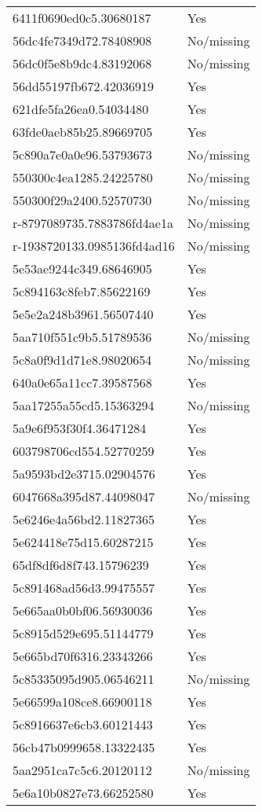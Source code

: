 \begin{tabular}{ll}
6411f0690ed0c5.30680187 & Yes \\
56dc4fe7349d72.78408908 & No/missing \\
56dc0f5e8b9dc4.83192068 & No/missing \\
56dd55197fb672.42036919 & Yes \\
621dfe5fa26ea0.54034480 & Yes \\
63fde0aeb85b25.89669705 & Yes \\
5c890a7e0a0e96.53793673 & No/missing \\
550300c4ea1285.24225780 & No/missing \\
550300f29a2400.52570730 & No/missing \\
r-8797089735.7883786fd4ae1a & No/missing \\
r-1938720133.0985136fd4ad16 & No/missing \\
5e53ae9244c349.68646905 & Yes \\
5c894163c8feb7.85622169 & Yes \\
5e5e2a248b3961.56507440 & Yes \\
5aa710f551c9b5.51789536 & No/missing \\
5c8a0f9d1d71e8.98020654 & No/missing \\
640a0e65a11cc7.39587568 & Yes \\
5aa17255a55cd5.15363294 & No/missing \\
5a9e6f953f30f4.36471284 & Yes \\
603798706cd554.52770259 & Yes \\
5a9593bd2e3715.02904576 & Yes \\
6047668a395d87.44098047 & No/missing \\
5e6246e4a56bd2.11827365 & Yes \\
5e624418e75d15.60287215 & Yes \\
65df8df6d8f743.15796239 & Yes \\
5c891468ad56d3.99475557 & Yes \\
5e665aa0b0bf06.56930036 & Yes \\
5c8915d529e695.51144779 & Yes \\
5e665bd70f6316.23343266 & Yes \\
5c85335095d905.06546211 & No/missing \\
5e66599a108ce8.66900118 & Yes \\
5c8916637e6cb3.60121443 & Yes \\
56cb47b0999658.13322435 & Yes \\
5aa2951ca7c5c6.20120112 & No/missing \\
5e6a10b0827e73.66252580 & Yes \\

\end{tabular}
